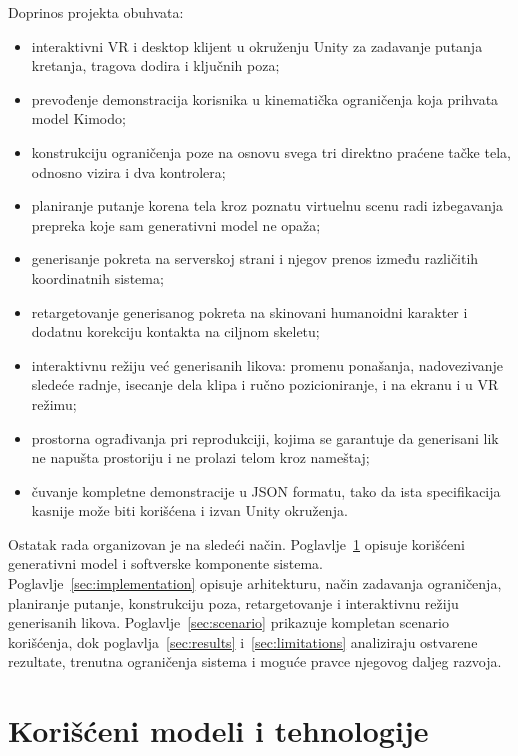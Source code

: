\documentclass{article}
\begin{document}
Doprinos projekta obuhvata:
\begin{itemize}
    \item interaktivni VR i desktop klijent u okruženju Unity za zadavanje putanja kretanja, tragova dodira i ključnih poza;
    \item prevođenje demonstracija korisnika u kinematička ograničenja koja prihvata model Kimodo;
    \item konstrukciju ograničenja poze na osnovu svega tri direktno praćene tačke tela, odnosno vizira i dva kontrolera;
    \item planiranje putanje korena tela kroz poznatu virtuelnu scenu radi izbegavanja prepreka koje sam generativni model ne opaža;
    \item generisanje pokreta na serverskoj strani i njegov prenos između različitih koordinatnih sistema;
    \item retargetovanje generisanog pokreta na skinovani humanoidni karakter i dodatnu korekciju kontakta na ciljnom skeletu;
    \item interaktivnu režiju već generisanih likova: promenu ponašanja, nadovezivanje sledeće radnje, isecanje dela klipa i ručno pozicioniranje, i na ekranu i u VR režimu;
    \item prostorna ograđivanja pri reprodukciji, kojima se garantuje da generisani lik ne napušta prostoriju i ne prolazi telom kroz nameštaj;
    \item čuvanje kompletne demonstracije u JSON formatu, tako da ista specifikacija kasnije može biti korišćena i izvan Unity okruženja.
\end{itemize}

Ostatak rada organizovan je na sledeći način. Poglavlje~\ref{sec:models} opisuje korišćeni generativni model i softverske komponente sistema. Poglavlje~\ref{sec:implementation} opisuje arhitekturu, način zadavanja ograničenja, planiranje putanje, konstrukciju poza, retargetovanje i interaktivnu režiju generisanih likova. Poglavlje~\ref{sec:scenario} prikazuje kompletan scenario korišćenja, dok poglavlja~\ref{sec:results} i~\ref{sec:limitations} analiziraju ostvarene rezultate, trenutna ograničenja sistema i moguće pravce njegovog daljeg razvoja.


\section{Korišćeni modeli i tehnologije}
\label{sec:models}
\end{document}
